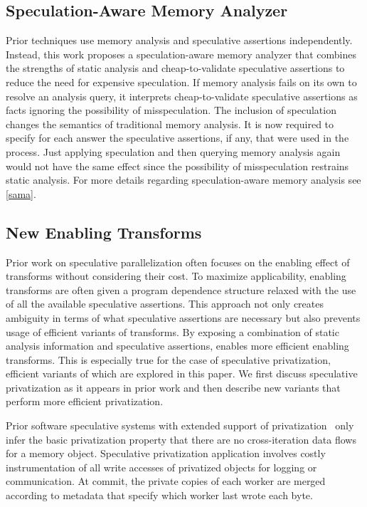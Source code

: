 \subsection{Speculation-Aware Memory Analyzer}
\label{sama_short}

Prior techniques use memory analysis and speculative assertions
independently.  Instead, this work proposes a speculation-aware memory
analyzer that combines the strengths of static analysis and
cheap-to-validate speculative assertions to reduce the need for
expensive speculation.  If memory analysis fails on its own to resolve
an analysis query, it interprets cheap-to-validate speculative
assertions as facts ignoring the possibility of misspeculation.
%
The inclusion of speculation changes the semantics of traditional
memory analysis. It is now required to specify for each answer the
speculative assertions, if any, that were used in the process.
%
Just applying speculation and then querying memory analysis again
would not have the same effect since the possibility of misspeculation
restrains static analysis. For more details regarding
speculation-aware memory analysis see \cref{sama}.

\subsection{New Enabling Transforms}
\label{new_enablers}

Prior work on speculative parallelization often focuses on the
enabling effect of transforms without considering their cost.  To
maximize applicability, enabling transforms are often given a program
dependence structure relaxed with the use of all the available
speculative assertions.  This approach not only creates ambiguity in
terms of what speculative assertions are necessary but also prevents
usage of efficient variants of transforms.
%
By exposing a combination of static analysis information and
speculative assertions, \name enables more efficient enabling
transforms.  This is especially true for the case of speculative
privatization, efficient variants of which are explored in this paper.
%
We first discuss speculative privatization as it appears in prior work
and then describe new variants that perform more efficient
privatization.

Prior software speculative systems with extended support of
privatization~\cite{johnson:12:pldi,kim:12:cgo} only infer the basic
privatization property that there are no cross-iteration data flows
for a memory object.
%
Speculative privatization application involves costly instrumentation
of all write accesses of privatized objects for logging or
communication. At commit, the private copies of each worker are merged
according to metadata that specify which worker last wrote each byte.

